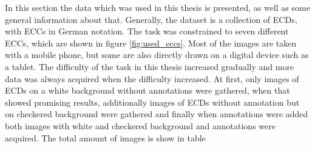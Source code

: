 In this section the data which was used in this thesis is presented, as well as some general information about that.
Generally, the dataset is a collection of \acp{ECD}, with \acp{ECC} in German notation.
The task was constrained to seven different \acp{ECC}, which are shown in figure \ref{fig:used_eccs}.
Most of the images are taken with a mobile phone, but some are also directly drawn on a digital device such as a tablet.
The difficulty of the task in this thesis increased gradually and more data was always acquired when the difficulty increased.
At first, only images of \acp{ECD} on a white background without annotations were gathered, when that showed promising results, additionally images of \acp{ECD} without annotation but on checkered background were gathered and finally when annotations were added both images with white and checkered background and annotations were acquired.
The total amount of images is show in table
